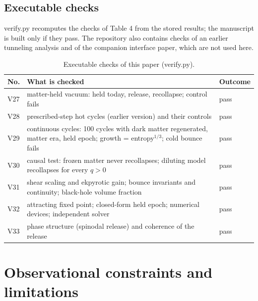 \documentclass[11pt,a4paper]{article}
\begin{document}
\subsection{Executable checks}
verify.py recomputes the checks of Table 4 from the stored results; the manuscript is built only if they pass. The repository also contains checks of an earlier tunneling analysis and of the companion interface paper, which are not used here.

\begin{table}[htbp]\centering\small
\caption{Executable checks of this paper (verify.py).}
\begin{tabular}{>{\raggedright\arraybackslash}p{0.086\dimexpr\textwidth-6\tabcolsep\relax}>{\raggedright\arraybackslash}p{0.819\dimexpr\textwidth-6\tabcolsep\relax}>{\raggedright\arraybackslash}p{0.095\dimexpr\textwidth-6\tabcolsep\relax}}
\toprule
No. & What is checked & Outcome \\ \midrule
V27 & matter-held vacuum: held today, release, recollapse; control fails & pass \\
V28 & prescribed-step hot cycles (earlier version) and their controls & pass \\
V29 & continuous cycles: 100 cycles with dark matter regenerated, matter era, held epoch; growth = entropy$^{1/3}$; cold bounce fails & pass \\
V30 & causal test: frozen matter never recollapses; diluting model recollapses for every $q>0$ & pass \\
V31 & shear scaling and ekpyrotic gain; bounce invariants and continuity; black-hole volume fraction & pass \\
V32 & attracting fixed point; closed-form held epoch; numerical devices; independent solver & pass \\
V33 & phase structure (spinodal release) and coherence of the release & pass \\
\bottomrule
\end{tabular}
\end{table}
\section{Observational constraints and limitations}
\end{document}
